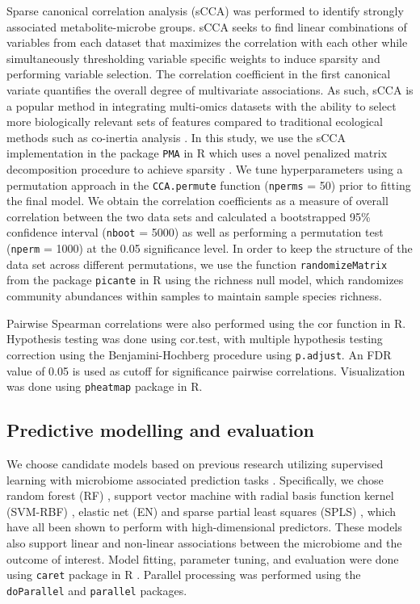 Sparse canonical correlation analysis (sCCA) was performed to identify strongly associated metabolite-microbe groups. sCCA seeks to find linear combinations of variables from each dataset that maximizes the correlation with each other while simultaneously thresholding variable specific weights to induce sparsity and performing variable selection. The correlation coefficient in the first canonical variate quantifies the overall degree of multivariate associations. As such, sCCA is a popular method in integrating multi-omics datasets with the ability to select more biologically relevant sets of features compared to traditional ecological methods such as co-inertia analysis \cite{cao2015sparse}. In this study, we use the sCCA implementation in the package \texttt{PMA} in R \cite{witten2019pma} which uses a novel penalized matrix decomposition procedure to achieve sparsity \cite{witten2009penalized}. We tune hyperparameters using a permutation approach in the \texttt{CCA.permute} function (\texttt{nperms} = 50) prior to fitting the final model. We obtain the correlation coefficients as a measure of overall correlation between the two data sets and calculated a bootstrapped 95\% confidence interval (\texttt{nboot} = 5000) as well as performing a permutation test (\texttt{nperm} = 1000) at the 0.05 significance level. In order to keep the structure of the data set across different permutations, we use the function \texttt{randomizeMatrix} from the package \texttt{picante} in R \cite{kembel2010picante} using the richness null model, which randomizes community abundances within samples to maintain sample species richness.  

Pairwise Spearman correlations were also performed using the cor function in R. Hypothesis testing was done using cor.test, with multiple hypothesis testing correction using the Benjamini-Hochberg procedure \cite{benjamini1995controlling} using \texttt{p.adjust}. An FDR value of 0.05 is used as cutoff for significance pairwise correlations. Visualization was done using \texttt{pheatmap} package in R.  

\subsection{Predictive modelling and evaluation}

We choose candidate models based on previous research utilizing supervised learning with microbiome associated prediction tasks \cite{zhou2019review, pasolli2016machine, mallick2019predictive}. Specifically, we chose random forest (RF) \cite{breiman2001random}, support vector machine with radial basis function kernel (SVM-RBF) \cite{boser1992training}, elastic net (EN) \cite{zou2005regularization} and sparse partial least squares (SPLS) \cite{chun2010sparse}, which have all been shown to perform with high-dimensional predictors. These models also support linear and non-linear associations between the microbiome and the outcome of interest. Model fitting, parameter tuning, and evaluation were done using \texttt{caret} package in R \cite{wing2019caret}. Parallel processing was performed using the \texttt{doParallel} \cite{corporation2019doparallel} and \texttt{parallel} packages. 

